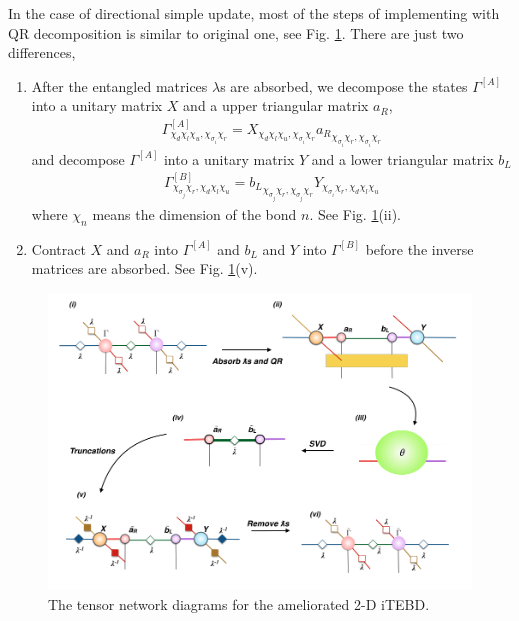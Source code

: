 In the case of directional simple update, most of the steps of implementing with QR decomposition is similar to original one, see Fig. \ref{fig318}. There are just two differences, 
\begin{enumerate}
	\item After the entangled matrices $\lambda$s are absorbed, we decompose the states $\Gamma^{[A]}$ into a unitary matrix $X$ and a upper triangular matrix $a_R$,
		\begin{align}
			\Gamma^{[A]}_{\chi_d \chi_l \chi_u, \chi_{\sigma_i} \chi_r} = X_{\chi_d \chi_l \chi_u, \chi_{\sigma_i} \chi_r} {a_R}_{\chi_{\sigma_i} \chi_r,\chi_{\sigma_i} \chi_r}
		\end{align}
		and decompose $\Gamma^{[A]}$ into a unitary matrix $Y$ and a lower triangular matrix $b_L$
		\begin{align}
			\Gamma^{[B]}_{\chi_{\sigma_j} \chi_r, \chi_d \chi_l \chi_u} = {b_L}_{\chi_{\sigma_j} \chi_r,\chi_{\sigma_j} \chi_r} Y_{\chi_{\sigma_i} \chi_r, \chi_d \chi_l \chi_u} 
		\end{align}
		where $\chi_n$ means the dimension of the bond $n$. See Fig. \ref{fig318}(ii).
	\item Contract $X$ and $a_R$ into $\Gamma^{[A]}$ and $b_L$ and $Y$ into $\Gamma^{[B]}$ before the inverse matrices are absorbed. See Fig. \ref{fig318}(v).

\end{enumerate}
\begin{figure}[H] 
	\centering 
	\includegraphics[width=1.00\textwidth]{figures/fig318.png} 
	\caption[The tensor network diagrams for the ameliorated 2-D iTEBD with QR decompositiont]{The tensor network diagrams for the ameliorated 2-D iTEBD.} 
	\label{fig318} 
\end{figure} 

